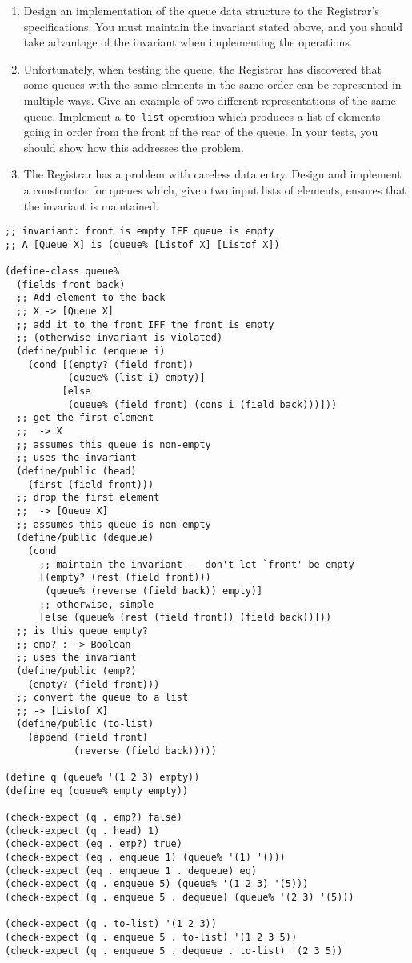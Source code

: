 \documentclass[12pt]{article}                   %
\newenvironment{solution}{}{}
\newcommand\code[1]{\texttt{#1}}
\begin{document}
\begin{problem}
\begin{enumerate}
\item Design an implementation of the queue data structure to the Registrar's
  specifications.  You must maintain the invariant stated above, and
  you should take advantage of the invariant when implementing the
  operations.
\item Unfortunately, when testing the queue, the Registrar has
  discovered that some queues with the same elements in the same order
  can be represented in multiple ways.  Give an example of two
  different representations of the same queue.  Implement a
  \code{to-list} operation which produces a list of elements going in
  order from the front of the rear of the queue. In your tests, you
  should show how this addresses the problem.
\item The Registrar has a problem with careless data entry.  Design
  and implement a constructor for queues which, given two input lists
  of elements, ensures that the invariant is maintained.  
\end{enumerate}

\begin{solution}
\begin{verbatim}
;; invariant: front is empty IFF queue is empty
;; A [Queue X] is (queue% [Listof X] [Listof X])

(define-class queue%
  (fields front back)
  ;; Add element to the back
  ;; X -> [Queue X]
  ;; add it to the front IFF the front is empty
  ;; (otherwise invariant is violated)
  (define/public (enqueue i)
    (cond [(empty? (field front))
           (queue% (list i) empty)]
          [else
           (queue% (field front) (cons i (field back)))]))
  ;; get the first element
  ;;  -> X
  ;; assumes this queue is non-empty
  ;; uses the invariant
  (define/public (head)
    (first (field front)))
  ;; drop the first element
  ;;  -> [Queue X]
  ;; assumes this queue is non-empty
  (define/public (dequeue)
    (cond 
      ;; maintain the invariant -- don't let `front' be empty
      [(empty? (rest (field front)))
       (queue% (reverse (field back)) empty)]
      ;; otherwise, simple
      [else (queue% (rest (field front)) (field back))]))
  ;; is this queue empty?
  ;; emp? : -> Boolean
  ;; uses the invariant
  (define/public (emp?)
    (empty? (field front)))
  ;; convert the queue to a list
  ;; -> [Listof X] 
  (define/public (to-list)
    (append (field front)
            (reverse (field back)))))

(define q (queue% '(1 2 3) empty))
(define eq (queue% empty empty))

(check-expect (q . emp?) false)
(check-expect (q . head) 1)
(check-expect (eq . emp?) true)
(check-expect (eq . enqueue 1) (queue% '(1) '()))
(check-expect (eq . enqueue 1 . dequeue) eq)
(check-expect (q . enqueue 5) (queue% '(1 2 3) '(5)))
(check-expect (q . enqueue 5 . dequeue) (queue% '(2 3) '(5)))

(check-expect (q . to-list) '(1 2 3))
(check-expect (q . enqueue 5 . to-list) '(1 2 3 5))
(check-expect (q . enqueue 5 . dequeue . to-list) '(2 3 5))
\end{verbatim}
\end{solution}
\end{problem}
\end{document}
